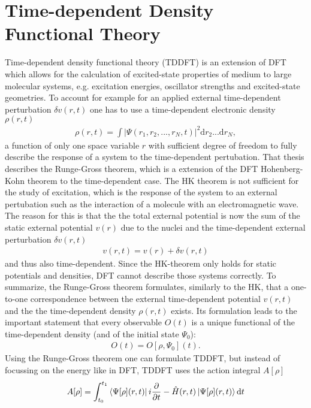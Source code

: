
\section{Time-dependent Density Functional Theory}
Time-dependent density functional theory (TDDFT) is an extension of DFT which allows for the calculation of excited-state properties of medium to large molecular systems, e.g. excitation energies, oscillator strengths and excited-state geometries.\cite{TDDFT} To account for example for an applied external time-dependent perturbation $δv(r, t)$ one has to use a time-dependent electronic density $\rho(r, t)$
\begin{align}
    \rho(r, t) = \int |\Psi(r_1, r_2, ..., r_N, t)|^2 \mathrm{d}r_2...\mathrm{d}r_N \mathrm{ ,}
\end{align}
a function of only one space variable $r$ with sufficient degree of freedom to fully describe the response of a system to the time-dependent pertubation. That thesis describes the Runge-Gross theorem\cite{Runge-Gross}, which is a extension of the DFT Hohenberg-Kohn theorem to the time-dependent case. The HK theorem is not sufficient for the study of excitation, which is the response of the system to an external pertubation such as the interaction of a molecule with an electromagnetic wave. The reason for this is that the the total external potential is now the sum of the static external potential $v(r)$ due to the nuclei and the time-dependent external perturbation $\delta v(r, t)$ 
\begin{align}
    v(r, t) = v(r) + \delta v(r, t)
\end{align}
and thus also time-dependent. Since the HK-theorem only holds for static potentials and densities, DFT cannot describe those systems correctly. To summarize, the Runge-Gross theorem formulates, similarly to the HK, that a one-to-one correspondence between the external time-dependent potential $v(r, t)$ and the the time-dependent density $\rho(r, t)$ exists. Its formulation leads to the important statement that every observable $O(t)$ is a unique functional of the time-dependent density (and of the initial state $\Psi_0$): 
\begin{align}
    O(t) = O[\rho, \Psi_0](t).
\end{align}
Using the Runge-Gross theorem one can formulate TDDFT, but instead of focussing on the energy like in DFT, TDDFT uses the action integral $A[\rho]$
\begin{align}
    A[\rho] = \int_{t_0}^{t_1}\bra{\Psi[\rho](r, t)}i\frac{\partial}{\partial t} - \hat{H}(r, t) \ket{\Psi[\rho](r, t)}\mathrm{d}t
\end{align}

